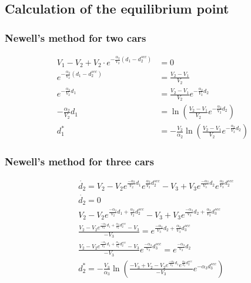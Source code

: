 \documentclass{article}
\begin{document}
	\subsection{Calculation of the equilibrium point}
	\subsubsection{Newell's method for two cars} \label{Equilibre:2}
	\begin{align*}
		V_1 - V_2 + V_2 \cdot e^{-\frac{\alpha_2}{V_2}(d_1 - d_{2}^{sec})} &= 0 \\
		e^{-\frac{\alpha_2}{V_2}(d_1 - d_{2}^{sec})} &= \frac{V_2-V_1}{V_2} \\
		e^{-\frac{\alpha_2}{V_2}d_1} &= \frac{V_2-V_1}{V_2}e^{-\frac{\alpha_2}{V_2}d_2} \\
		-\frac{\alpha_2}{V_2}d_1 &= \ln \left(\frac{V_2-V_1}{V_2}e^{-\frac{\alpha_2}{V_2}d_2} \right) \\
		d_1^* &= -\frac{V_2}{\alpha_2}\ln \left(\frac{V_2-V_1}{V_2}e^{-\frac{\alpha_2}{V_2}d_2} \right)
	\end{align*}
	
	\subsubsection{Newell's method for three cars}
	
	\begin{align*}
		&\dot{d_2}=V_2-V_2e^{\frac{-\alpha_2}{V_2}d_1}e^{\frac{\alpha_2}{V_2}d_2^{sec}}-V_3+V_3e^{\frac{-\alpha_3}{V_3}d_2}e^{\frac{\alpha_3}{V_3}d_2^{ sec}} \\
		&\dot{d_2}=0 \\
		&V_2-V_2e^{\frac{-\alpha_2}{V_2}d_1+\frac{\alpha_2}{V_2}d_2^{sec}}-V_3+V_3e^{\frac{-\alpha_3}{V_3}d_2+\frac{\alpha_3}{V_3}d_3^{sec}} \\
		&\frac{V_2-V_2e^{\frac{-\alpha_2}{V_2}d_1+\frac{\alpha_2}{V_2}d_2^{sec}}-V_3}{-V_3}=e^{\frac{-\alpha_3}{V_3}d_2+\frac{\alpha_3}{V_3}d_3^{sec}} \\
		&\frac{V_2-V_2e^{\frac{-\alpha_2}{V_2}d_1+\frac{\alpha_2}{V_2}d_2^{sec}}-V_3}{-V_3}e^{\frac{-\alpha_3}{V_3}d_3^{sec}} =e^{\frac{-\alpha_3}{V_3}d_2} \\
		&d_2^* = -\frac{V_3}{\alpha_3}\ln \left(\frac{-V_3+V_2-V_2e^{\frac{-\alpha_2}{V_2}d_1}e^{\frac{\alpha_2}{V_2}d_2^{sec}}}{-V_3}e^{-\alpha_3 d_3^{sec}} \right)
	\end{align*}
	
	
	\newpage
	
	\printbibliography
\end{document}
